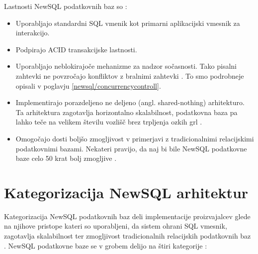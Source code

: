 \documentclass[a4paper, 12pt]{book}
\begin{document}
\noindent Lastnosti NewSQL podatkovnih baz so \cite{Kumar2018Jun}:
\begin{itemize}
    \item Uporabljajo standardni SQL vmenik kot primarni aplikacijski vmesnik za interakcijo.
    \item Podpirajo ACID transakcijske lastnosti.
    \item Uporabljajo neblokirajoče mehanizme za nadzor sočasnosti. Tako pisalni zahtevki ne povzročajo konfliktov z bralnimi zahtevki \cite{NewSQLNewWayToHandleBigData}. To smo podrobneje opisali v poglavju \ref{newsql/concurrencycontroll}.
    \item Implementirajo porazdeljeno ne deljeno (angl. shared-nothing) arhitekturo. Ta arhitektura zagotavlja horizontalno skalabilnost, podatkovna baza pa lahko teče na velikem številu vozlišč brez trpljenja ozkih grl \cite{NewSQLNewWayToHandleBigData}.
    \item Omogočajo dosti boljšo zmogljivost v primerjavi z tradicionalnimi relacijskimi podatkovnimi bazami. Nekateri pravijo, da naj bi bile NewSQL podatkovne baze celo 50 krat bolj zmogljive \cite{Kumar2018Jun}.
\end{itemize}

\section{Kategorizacija NewSQL arhitektur}
Kategorizacija NewSQL podatkovnih baz deli implementacije proizvajalcev glede na njihove pristope kateri so uporabljeni, da sistem ohrani SQL vmesnik, zagotavlja skalabilnost ter zmogljivost tradicionalnih relacijskih podatkovnih baz \cite{NewSQLNewWayToHandleBigData}. NewSQL podatkovne baze se v grobem delijo na štiri kategorije \cite{Mikuletic2015Feb, Pavlo2016Sep}:
\end{document}
